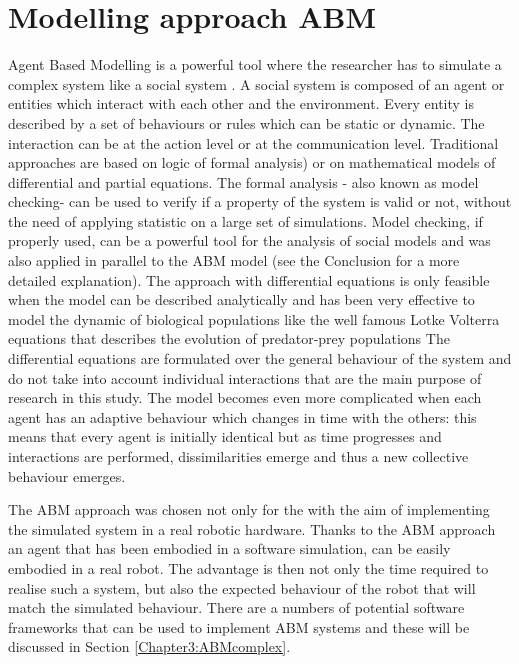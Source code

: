 \section{Modelling approach ABM}
Agent Based Modelling is a powerful tool where the researcher has to simulate a complex
system like a social system \citep{WMacyWiller2002:SocialABM}.
A social system is composed of an agent or entities which interact with each
other and the environment.
Every entity is described by a set of behaviours or rules which can be static
or dynamic.
The interaction can be at the action level or at the communication level.
Traditional approaches are based on logic of formal analysis) or on
mathematical models of differential and partial equations.
The formal analysis - also known as model checking- can be used to verify if a
property of the system is valid or not, without the need of applying statistic
on a large set of simulations.
Model checking, if properly used, can be a powerful tool for the analysis of
social models and was also applied in parallel to the ABM model (see the Conclusion
for a more detailed explanation).
The approach with differential equations is only feasible when the model can 
be described analytically and has been very effective to model the dynamic of biological
populations like the well famous Lotke Volterra equations \citep{LotkeVolterra1931:PredatorPrey} that describes the
 evolution of predator-prey populations 
The differential equations are formulated over the general behaviour of the system
 and do not take into account individual interactions that are the main 
purpose of research in this study.
The model becomes even more complicated when each agent has an adaptive
behaviour which changes in time with the others: this means that every
agent is initially identical but as time progresses and interactions are
performed, dissimilarities emerge and thus a new collective behaviour emerges.

The ABM approach was chosen not only for the with the aim of implementing the simulated system
 in a real robotic hardware.
Thanks to the ABM approach an agent that has been embodied in a software simulation,
 can be easily embodied in a real robot.
The advantage is then not only the time required to realise such a system,
but also the expected behaviour of the robot that will match the simulated behaviour.
There are a numbers of potential software frameworks that can be used to
implement ABM systems and these will be discussed in Section
\ref{Chapter3:ABMcomplex}.

